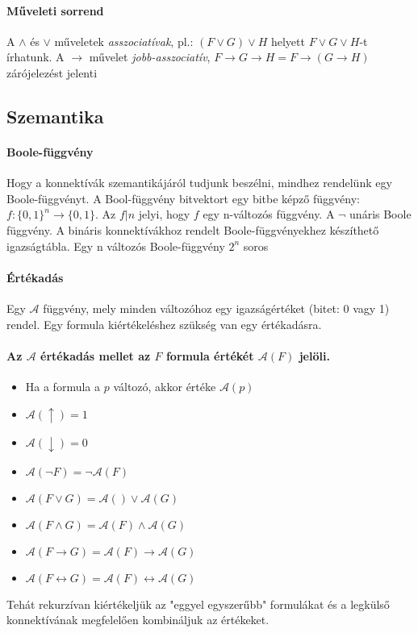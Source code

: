 \documentclass[10pt,a4paper]{article}
\begin{document}
\paragraph{Műveleti sorrend}
A $\wedge$ és $\vee$ műveletek \textit{asszociatívak}, pl.: $(F \vee G) \vee H$ helyett $F \vee G \vee H$-t írhatunk. A $\rightarrow$ művelet \textit{jobb-asszociatív}, $F \rightarrow G \rightarrow H = F \rightarrow ( G \rightarrow H)$ zárójelezést jelenti
\subsection{Szemantika}
\paragraph{Boole-függvény}
Hogy a konnektívák szemantikájáról tudjunk beszélni, mindhez rendelünk egy Boole-függvényt. A Bool-függvény bitvektort egy bitbe képző függvény: $f: \{0,1\}^{n} \rightarrow \{0,1\}.$ \newline
Az $f|n$ jelyi, hogy $f$ egy n-változós függvény. A $\neg$ unáris Boole függvény. A bináris konnektívákhoz rendelt Boole-függvényekhez készíthető igazságtábla. Egy n változós  Boole-függvény $2^{n}$ soros
\paragraph{Értékadás}
Egy $\mathcal{A}$ függvény, mely minden változóhoz egy igazságértéket (bitet: 0 vagy 1) rendel. Egy formula kiértékeléshez szükség van egy értékadásra. \newline
\paragraph{Az $\mathcal{A}$ értékadás mellet az $F$ formula értékét $\mathcal{A}(F)$ jelöli.}
\begin{itemize}
\item Ha a formula a $p$ változó, akkor értéke $\mathcal{A}(p)$
\item $\mathcal{A}(\uparrow) = 1$
\item $\mathcal{A}(\downarrow) = 0$
\item $\mathcal{A}(\neg F) = \neg \mathcal{A}(F)$
\item $\mathcal{A}(F \vee G) = \mathcal{A}() \vee \mathcal{A}(G)$
\item $\mathcal{A}(F \wedge G) = \mathcal{A}(F) \wedge \mathcal{A}(G)$
\item $\mathcal{A}(F \rightarrow G) = \mathcal{A}(F) \rightarrow \mathcal{A}(G)$
\item $\mathcal{A}(F \leftrightarrow G) = \mathcal{A}(F) \leftrightarrow \mathcal{A}(G)$
\end{itemize}
Tehát rekurzívan kiértékeljük az "eggyel egyszerűbb" formulákat és a legkülső konnektívának megfelelően kombináljuk az értékeket.
\end{document}
